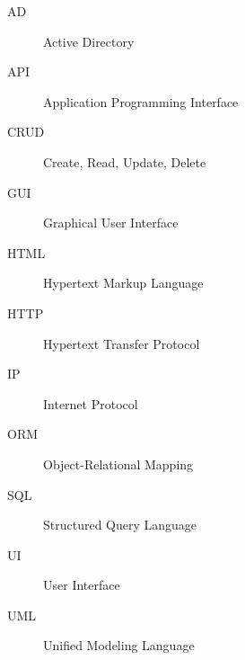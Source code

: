
\begin{description}
	\item[AD] Active Directory
	\item[API] Application Programming Interface
	\item[CRUD] Create, Read, Update, Delete
	\item[GUI] Graphical User Interface
	\item[HTML] Hypertext Markup Language
	\item[HTTP] Hypertext Transfer Protocol
	\item[IP] Internet Protocol
	\item[ORM] Object-Relational Mapping
	\item[SQL] Structured Query Language
	\item[UI] User Interface
	\item[UML] Unified Modeling Language
\end{description}
